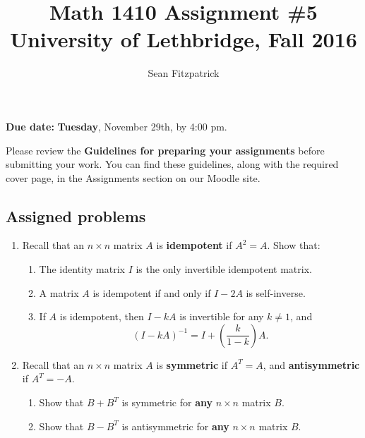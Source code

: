 \documentclass[letterpaper,12pt]{amsart}
\title{Math 1410 Assignment \#5\\University of Lethbridge, Fall 2016}
\author{Sean Fitzpatrick}
\begin{document}
 \maketitle

{\bf Due date:} {\bf Tuesday}, November 29th, by 4:00 pm.

\bigskip

Please review the {\bf Guidelines for preparing your assignments} before submitting your work. You can find these guidelines, along with the required cover page, in the Assignments section on our Moodle site.



\subsection*{Assigned problems}
\begin{enumerate}

\item Recall that an $n\times n$ matrix $A$ is {\bf idempotent} if $A^2=A$. Show that:

\medskip

\begin{enumerate}
 \item The identity matrix $I$ is the only invertible idempotent matrix.

\medskip

 \item A matrix $A$ is idempotent if and only if $I-2A$ is self-inverse. 

\medskip

 \item If $A$ is idempotent, then $I-kA$ is invertible for any $k\neq 1$, and
\[
 (I-kA)^{-1} = I+\left(\frac{k}{1-k}\right)A.
\]
\end{enumerate}

\bigskip


\item Recall that an $n\times n$ matrix $A$ is {\bf symmetric} if $A^T=A$, and {\bf antisymmetric} if $A^T=-A$.

\bigskip

\begin{enumerate}
 \item Show that $B+B^T$ is symmetric for {\bf any} $n\times n$ matrix $B$.

\medskip

 \item Show that $B-B^T$ is antisymmetric for {\bf any} $n\times n$ matrix $B$.


\end{enumerate}
\end{enumerate}
\end{document}

